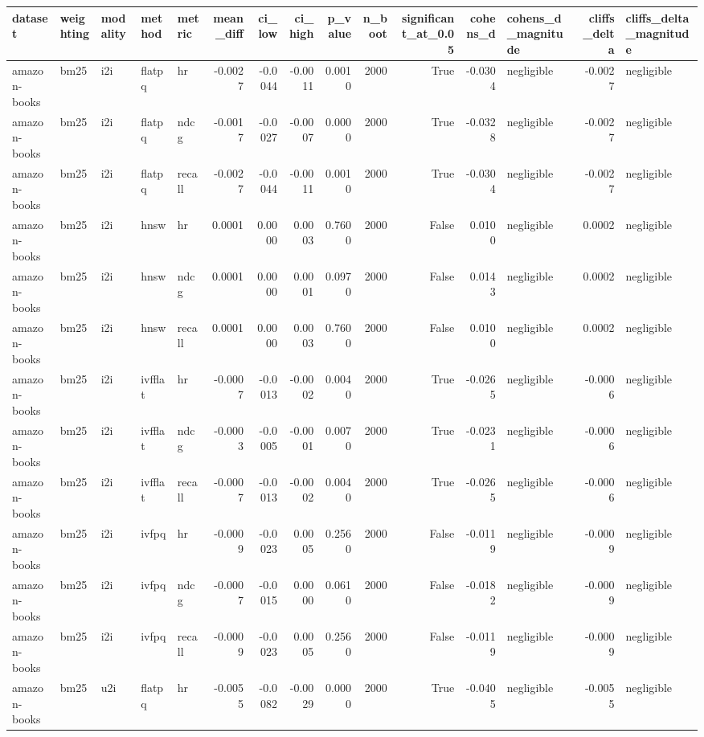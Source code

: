 \begin{tabular}{lllllrrrrrrrlrl}
\toprule
dataset & weighting & modality & method & metric & mean_diff & ci_low & ci_high & p_value & n_boot & significant_at_0.05 & cohens_d & cohens_d_magnitude & cliffs_delta & cliffs_delta_magnitude \\
\midrule
amazon-books & bm25 & i2i & flatpq & hr & -0.0027 & -0.0044 & -0.0011 & 0.0010 & 2000 & True & -0.0304 & negligible & -0.0027 & negligible \\
amazon-books & bm25 & i2i & flatpq & ndcg & -0.0017 & -0.0027 & -0.0007 & 0.0000 & 2000 & True & -0.0328 & negligible & -0.0027 & negligible \\
amazon-books & bm25 & i2i & flatpq & recall & -0.0027 & -0.0044 & -0.0011 & 0.0010 & 2000 & True & -0.0304 & negligible & -0.0027 & negligible \\
amazon-books & bm25 & i2i & hnsw & hr & 0.0001 & 0.0000 & 0.0003 & 0.7600 & 2000 & False & 0.0100 & negligible & 0.0002 & negligible \\
amazon-books & bm25 & i2i & hnsw & ndcg & 0.0001 & 0.0000 & 0.0001 & 0.0970 & 2000 & False & 0.0143 & negligible & 0.0002 & negligible \\
amazon-books & bm25 & i2i & hnsw & recall & 0.0001 & 0.0000 & 0.0003 & 0.7600 & 2000 & False & 0.0100 & negligible & 0.0002 & negligible \\
amazon-books & bm25 & i2i & ivfflat & hr & -0.0007 & -0.0013 & -0.0002 & 0.0040 & 2000 & True & -0.0265 & negligible & -0.0006 & negligible \\
amazon-books & bm25 & i2i & ivfflat & ndcg & -0.0003 & -0.0005 & -0.0001 & 0.0070 & 2000 & True & -0.0231 & negligible & -0.0006 & negligible \\
amazon-books & bm25 & i2i & ivfflat & recall & -0.0007 & -0.0013 & -0.0002 & 0.0040 & 2000 & True & -0.0265 & negligible & -0.0006 & negligible \\
amazon-books & bm25 & i2i & ivfpq & hr & -0.0009 & -0.0023 & 0.0005 & 0.2560 & 2000 & False & -0.0119 & negligible & -0.0009 & negligible \\
amazon-books & bm25 & i2i & ivfpq & ndcg & -0.0007 & -0.0015 & 0.0000 & 0.0610 & 2000 & False & -0.0182 & negligible & -0.0009 & negligible \\
amazon-books & bm25 & i2i & ivfpq & recall & -0.0009 & -0.0023 & 0.0005 & 0.2560 & 2000 & False & -0.0119 & negligible & -0.0009 & negligible \\
amazon-books & bm25 & u2i & flatpq & hr & -0.0055 & -0.0082 & -0.0029 & 0.0000 & 2000 & True & -0.0405 & negligible & -0.0055 & negligible \\

\end{tabular}
